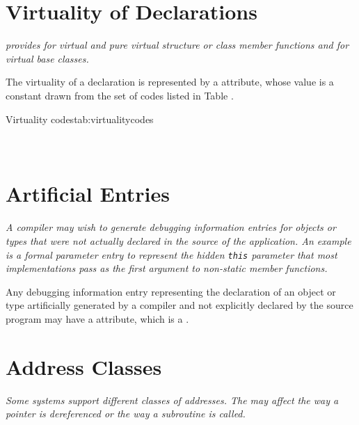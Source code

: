 \section{Virtuality of Declarations}
\label{chap:virtualityofdeclarations}
\textit{ provides for virtual and pure virtual structure or class
member functions and for virtual base classes.}

The\hypertarget{chap:DWATvirtualityvirtualityindication}{}
virtuality of a declaration is represented by a
\DWATvirtualityDEFN{}
attribute, whose value is a constant drawn
from the set of codes listed in 
Table .

\begin{simplenametable}[2.5in]{Virtuality codes}{tab:virtualitycodes}
\DWVIRTUALITYnoneTARG{}                      \\
\DWVIRTUALITYvirtualTARG{}                \\
\DWVIRTUALITYpurevirtualTARG{}    \\
\end{simplenametable}

\section{Artificial Entries}
\label{chap:artificialentries}
\textit{A compiler may wish to generate debugging information entries
for objects or types that were not actually declared in the
source of the application. An example is a formal parameter
entry to represent the hidden 
\texttt{this} parameter
that most  implementations pass as the first argument 
to non-static member functions.}  

Any debugging information entry representing the
declaration of an object or type artificially generated by
a compiler and not explicitly declared by the source 
program\hypertarget{chap:DWATartificialobjectsortypesthat}{}
may have a 
\DWATartificialDEFN{} attribute, 
which is a .

\bb
\section{Address Classes}
\label{chap:addressclasses}
\eb
\textit{Some systems support different classes of addresses. 
The  may affect the way a pointer 
is dereferenced or the way a subroutine is called.}

